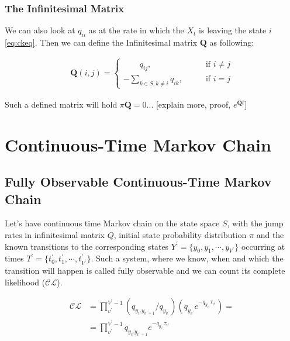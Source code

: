 \documentclass[thesis=M,english]{FITthesis}[2012/10/20]
\newcommand{\matr}[1]{\mathbf{#1}}
\begin{document}

\subsubsection{The Infinitesimal Matrix}

We can also look at $q_{ii}$ as at the rate in which the $X_t$ is leaving the state $i$ \eqref{eq:ckeq}. Then we can define the Infinitesimal matrix $\matr{Q}$ as following:

\begin{equation}
\begin{aligned}  
\matr{Q}(i,j)= 
\begin{cases}
\qquad q_{ij}, \qquad & \text{if } i\neq j\\
- \sum\limits_{k \in S ,k \neq i} q_{ik}, \qquad & \text{if } i=j
\end{cases}
\end{aligned}
\end{equation}

Such a defined matrix will hold $\pi\matr{Q} = 0$... [explain more, proof, $e^{\matr{Q}t}$]

\section{ Continuous-Time Markov Chain }


\subsection{ Fully Observable Continuous-Time Markov Chain }

Let's have continuous time Markov chain on the state space $S$, with the jump rates in infinitesimal matrix $Q$, initial state probability distribution $\pi$ and the known transitions to the corresponding states $Y^{'}= \{y_0, y_1, \cdots, y_{V^{'}} \} $ occurring at times $T^{'} = \{ t_0^{'}, t_1^{'}, \cdots, t_{V^{'}}^{'} \}$. Such a system, where we know, when and which the transition will happen is called fully observable and we can count its complete likelihood ($\mathcal{CL}$). 

\begin{equation}\label{eq:CL1}
\begin{aligned}  
 \mathcal{CL} &=  \prod_{v^{'}}^{V^{'}-1} ( q_{y_{v^{'}} y_{v^{'}+1}} / q_{y_{v^{'}}} )( q_{y_{v^{'}}} e^{ - q_{y_{v^{'}}} \tau_{v^{'}} }) = \\
    &= \prod_{v^{'}}^{V^{'}-1} q_{y_{v^{'}} y_{v^{'}+1}} e^{ - q_{y_{v^{'}}} \tau_{v^{'}} }
\end{aligned}
\end{equation}
\end{document}
